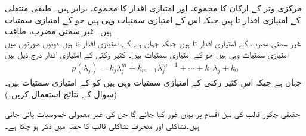 مرکزی وتر کے ارکان کا مجموعہ اور امتیازی اقدار کا مجموعہ برابر ہیں۔
\quad طیفی منتقلی\\
 کے امتیازی اقدار  تا   ہیں جبکہ اس کے امتیازی سمتیات وہی ہیں جو  کے امتیازی سمتیات ہیں۔
\quad غیر سمتی مضرب، طاقت\\
غیر سمتی مضرب  کے امتیازی اقدار  تا  ہیں جبکہ  جہاں  ہے کے امتیازی اقدار  تا  ہیں۔دونوں صورتوں میں امتیازی سمتیات وہی ہیں جو  کے امتیازی سمتیات ہیں۔
کثیر رکنی  کے امتیازی اقدار درج ذیل ہیں
\begin{align*}
p(\lambda_j)=k_j\lambda_j^m+k_{m-1}\lambda_j^{m-1}+\cdots+k_1\lambda_j+k_0
\end{align*}
جہاں  ہے جبکہ اس کثیر رکنی کے امتیازی سمتیات وہی ہیں کو  کے امتیازی سمتیات ہیں۔(سوال  کے نتائج استعمال کریں۔)

حقیقی چکور قالب کی تین اقسام پر یہاں غور کیا جائے گا جن کی غیر معمولی خصوصیات پائی جاتی ہیں۔تشاکلی اور منحرف تشاکلی قالب کا حصہ  میں ذکر ہو چکا ہے۔


